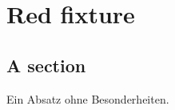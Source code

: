 \chapter{Red fixture}\label{c98}

\section{A section}\label{c98.s1}

Ein Absatz ohne Besonderheiten.
